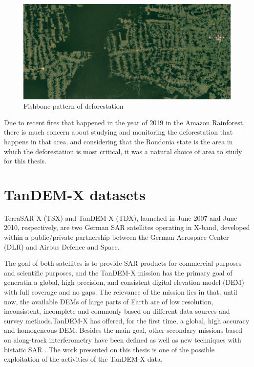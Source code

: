 \begin{figure}[H]
    \centering
    \includegraphics[width=0.8\linewidth]{Chapter2-real/fishbone.png}
    \caption{Fishbone pattern of deforestation}
    \label{fig:fishbone}
\end{figure}{}

Due to recent fires that happened in the year of 2019 in the Amazon Rainforest, there is much concern about studying and monitoring the deforestation that happens in that area, and considering that the Rondonia state is the area in which the deforestation is most critical, it was a natural choice of area to study for this thesis. 

\section{TanDEM-X datasets}
TerraSAR-X (TSX) and TanDEM-X (TDX), launched in June 2007 and June 2010, respectively, are two German SAR satellites operating in X-band, developed within a public/private partnership
between the German Aerospace Center (DLR) and Airbus Defence and Space. 


The goal of both satellites is to provide SAR products for commercial purposes and scientific purposes, and the TanDEM-X mission has the primary goal of generatin a global, high precision, and consistent digital elevation model (DEM) with full coverage and no gaps. The relevance of the mission lies in that, until now, the available DEMs
of large parts of Earth are of low resolution, inconsistent, incomplete and commonly
based on different data sources and survey methods.\newline TanDEM-X has offered, for the first
time, a global, high accuracy and homogeneous DEM. Besides the main goal, other secondary missions based on along-track interferometry have been defined as well
as new techniques with bistatic SAR \cite{vintetres, vintequatro}. The work presented on this thesis is one of the possible exploitation of the activities of the TanDEM-X data.

